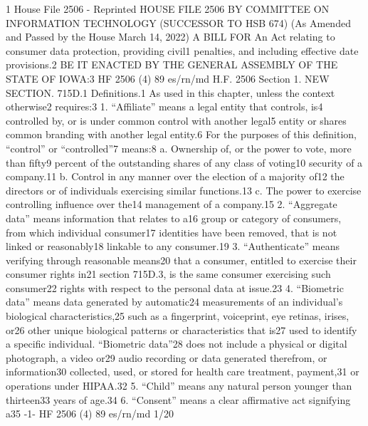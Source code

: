 
1
House File 2506 - Reprinted
HOUSE FILE 2506
BY COMMITTEE ON INFORMATION
TECHNOLOGY
(SUCCESSOR TO HSB 674)
(As Amended and Passed by the House March 14, 2022)
A BILL FOR
An Act relating to consumer data protection, providing civil1
penalties, and including effective date provisions.2
BE IT ENACTED BY THE GENERAL ASSEMBLY OF THE STATE OF IOWA:3
HF 2506 (4) 89
es/rn/md
H.F. 2506
Section 1. NEW SECTION. 715D.1 Definitions.1
As used in this chapter, unless the context otherwise2
requires:3
1. “Affiliate” means a legal entity that controls, is4
controlled by, or is under common control with another legal5
entity or shares common branding with another legal entity.6
For the purposes of this definition, “control” or “controlled”7
means:8
a. Ownership of, or the power to vote, more than fifty9
percent of the outstanding shares of any class of voting10
security of a company.11
b. Control in any manner over the election of a majority of12
the directors or of individuals exercising similar functions.13
c. The power to exercise controlling influence over the14
management of a company.15
2. “Aggregate data” means information that relates to a16
group or category of consumers, from which individual consumer17
identities have been removed, that is not linked or reasonably18
linkable to any consumer.19
3. “Authenticate” means verifying through reasonable means20
that a consumer, entitled to exercise their consumer rights in21
section 715D.3, is the same consumer exercising such consumer22
rights with respect to the personal data at issue.23
4. “Biometric data” means data generated by automatic24
measurements of an individual’s biological characteristics,25
such as a fingerprint, voiceprint, eye retinas, irises, or26
other unique biological patterns or characteristics that is27
used to identify a specific individual. “Biometric data”28
does not include a physical or digital photograph, a video or29
audio recording or data generated therefrom, or information30
collected, used, or stored for health care treatment, payment,31
or operations under HIPAA.32
5. “Child” means any natural person younger than thirteen33
years of age.34
6. “Consent” means a clear affirmative act signifying a35
-1-
HF 2506 (4) 89
es/rn/md 1/20
